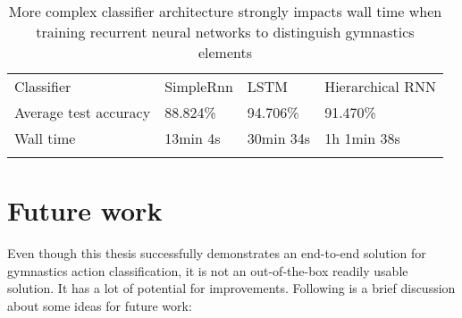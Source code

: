 \begin{table}[htb]
\begin{tabular}{llll}
Classifier            & SimpleRnn & LSTM      & Hierarchical RNN  \\
Average test accuracy & 88.824\%  & 94.706\%  & 91.470\%          \\
Wall time             & 13min 4s  & 30min 34s & 1h 1min 38s       \\
 &  &  &  
\end{tabular}
\caption{More complex classifier architecture strongly impacts wall time when training recurrent neural networks to distinguish gymnastics elements}
\label{classifier-wall-time}
\end{table}

\section{Future work}

Even though this thesis successfully demonstrates an end-to-end solution for gymnastics action classification, it is not an out-of-the-box readily usable solution. It has a lot of potential for improvements. Following is a brief discussion about some ideas for future work:

